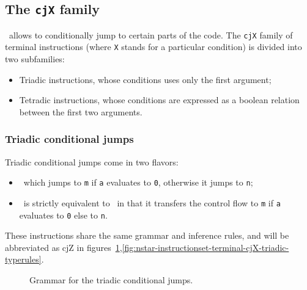 \subsection{The \texttt{cjX} family}\label{subsec:nstar-instructionset-terminal-cjX}

\nstar\ allows to conditionally jump to certain parts of the code.
The \texttt{cjX} family of terminal instructions (where \texttt{X} stands for a particular condition) is divided into two subfamilies:
\begin{itemize}
	\item Triadic instructions, whose conditions uses only the first argument;
	\item Tetradic instructions, whose conditions are expressed as a boolean relation between the first two arguments.
\end{itemize}

\subsubsection{Triadic conditional jumps}\label{subsubsec:nstar-instructionset-terminal-cjX-triadic}

Triadic conditional jumps come in two flavors:
\begin{itemize}
	\item {}\ which jumps to \texttt{m} if \texttt{a} evaluates to \texttt{0}, otherwise it jumps to \texttt{n};
	\item {}\ is strictly equivalent to \ in that it transfers the control flow to \texttt{m} if \texttt{a} evaluates to \texttt{0} else to \texttt{n}.
\end{itemize}

These instructions share the same grammar and inference rules, and will be abbreviated as {\Iformat cjZ} in figures~\ref{fig:nstar-instructionset-terminal-cjX-triadic-grammar},\ref{fig:nstar-instructionset-terminal-cjX-triadic-typerules}.

\begin{figure}[H]
	\centering


	\caption{Grammar for the triadic conditional jumps.}
	\label{fig:nstar-instructionset-terminal-cjX-triadic-grammar}
\end{figure}

